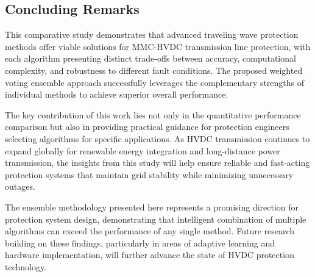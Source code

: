 \documentclass[journal]{IEEEtran}
\begin{document}
\subsection{Concluding Remarks}

This comparative study demonstrates that advanced traveling wave protection methods offer viable solutions for MMC-HVDC transmission line protection, with each algorithm presenting distinct trade-offs between accuracy, computational complexity, and robustness to different fault conditions. The proposed weighted voting ensemble approach successfully leverages the complementary strengths of individual methods to achieve superior overall performance.

The key contribution of this work lies not only in the quantitative performance comparison but also in providing practical guidance for protection engineers selecting algorithms for specific applications. As HVDC transmission continues to expand globally for renewable energy integration and long-distance power transmission, the insights from this study will help ensure reliable and fast-acting protection systems that maintain grid stability while minimizing unnecessary outages.

The ensemble methodology presented here represents a promising direction for protection system design, demonstrating that intelligent combination of multiple algorithms can exceed the performance of any single method. Future research building on these findings, particularly in areas of adaptive learning and hardware implementation, will further advance the state of HVDC protection technology.
\end{document}
